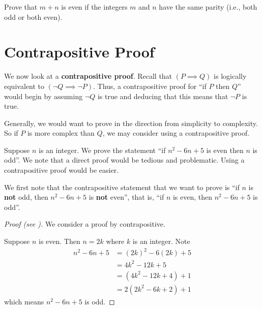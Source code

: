 \begin{exercise}
    Prove that $m + n$ is even if the integers $m$ and $n$ have the same parity (i.e., both odd or both even).
\end{exercise}

\section{Contrapositive Proof}
We now look at a \textbf{contrapositive proof}. Recall that $(P \implies Q)$ is logically equivalent to $(\lnot Q \implies \lnot P)$. Thus, a contrapositive proof for ``if $P$ then $Q$'' would begin by assuming $\lnot Q$ is true and deducing that this means that $\lnot P$ is true.

Generally, we would want to prove in the direction from simplicity to complexity. So if $P$ is more complex than $Q$, we may consider using a contrapositive proof.

\begin{example}\label{example-if-(n-1)(n-5)-is-even-then-n-is-odd}
    Suppose $n$ is an integer. We prove the statement ``if $n^2 - 6n + 5$ is even then $n$ is odd''. We note that a direct proof would be tedious and problematic. Using a contrapositive proof would be easier.

    We first note that the contrapositive statement that we want to prove is ``if $n$ is \textbf{not} odd, then $n^2 - 6n + 5$ is \textbf{not} even'', that is, ``if $n$ is even, then $n^2 - 6n + 5$ is odd''.
    \begin{proof}[Proof (see {\cite[p.~130]{hammack_2018}})]
        We consider a proof by contrapositive.

        Suppose $n$ is even. Then $n = 2k$ where $k$ is an integer. Note
        \begin{align*}
            n^2 - 6n + 5 &= (2k)^2 - 6(2k) + 5\\
            &= 4k^2 - 12k + 5\\
            &= (4k^2 - 12k + 4) + 1\\
            &= 2(2k^2 - 6k + 2) + 1
        \end{align*}
        which means $n^2 - 6n + 5$ is odd.
    \end{proof}
\end{example}

